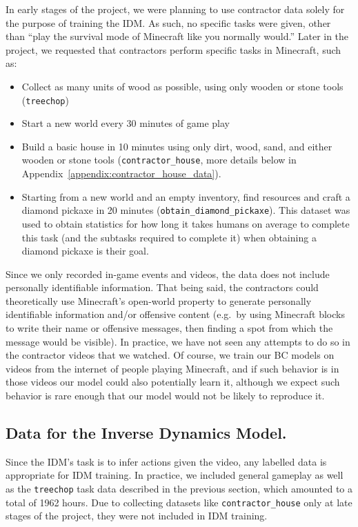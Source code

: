 In early stages of the project, we were planning to use contractor data solely for the purpose of training the IDM.
As such, no specific tasks were given, other than ``play the survival mode of Minecraft like you normally would.''
Later in the project, we requested that contractors perform specific tasks in Minecraft, such as:
\begin{itemize}
    \item Collect as many units of wood as possible, using only wooden or stone tools (\texttt{treechop})
    \item Start a new world every 30 minutes of game play
    \item Build a basic house in 10 minutes using only dirt, wood, sand, and either wooden or stone tools (\texttt{contractor\_house}, more details below in Appendix~\ref{appendix:contractor_house_data}).
    \item Starting from a new world and an empty inventory, find resources and craft a diamond pickaxe in 20 minutes (\texttt{obtain\_diamond\_pickaxe}). This dataset was used to obtain statistics for how long it takes humans on average to complete this task (and the subtasks required to complete it) when obtaining a diamond pickaxe is their goal.
\end{itemize}

Since we only recorded in-game events and videos, the data does not include personally identifiable information. That being said, the contractors could theoretically use Minecraft's open-world property to generate personally identifiable information and/or offensive content (e.g.\ by using Minecraft blocks to write their name or offensive messages, then finding a spot from which the message would be visible). In practice, we have not seen any attempts to do so in the contractor videos that we watched. Of course, 
we train our BC models on videos from the internet of people playing Minecraft, and if such behavior is in those videos our model could also potentially learn it, although we expect such behavior is rare enough that our model would not be likely to reproduce it.

\subsection{Data for the Inverse Dynamics Model.}
Since the IDM's task is to infer actions given the video, any labelled data is appropriate for IDM training. In practice, 
we included general gameplay as well as the \texttt{treechop} task data described in the previous section, which amounted to a total of 1962 hours. Due to collecting datasets like \texttt{contractor\_house} only at late stages of the project, they were not included in IDM training.

